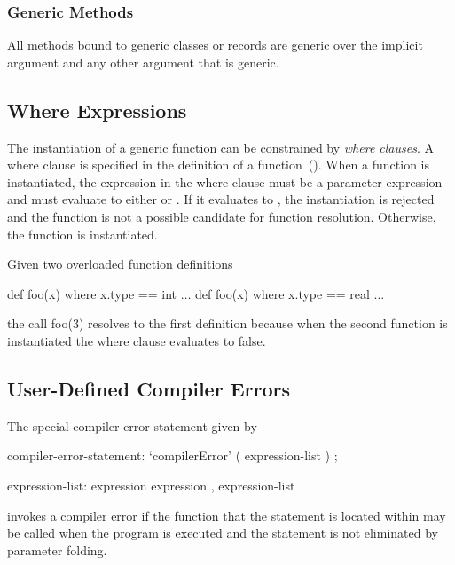 \subsubsection{Generic Methods}
\label{Generic_Methods}

All methods bound to generic classes or records are generic over the
implicit  argument and any other argument that is generic.

\subsection{Where Expressions}
\label{Where_Expressions}

The instantiation of a generic function can be constrained by {\em
where clauses}.  A where clause is specified in the definition of a
function~().  When a function is
instantiated, the expression in the where clause must be a parameter
expression and must evaluate to either  or .
If it evaluates to , the instantiation is rejected and the
function is not a possible candidate for function resolution.
Otherwise, the function is instantiated.
\begin{example}
Given two overloaded function definitions
\begin{chapel}
def foo(x) where x.type == int { $\ldots$ }
def foo(x) where x.type == real { $\ldots$ }
\end{chapel}
the call foo(3) resolves to the first definition because when the
second function is instantiated the where clause evaluates to false.
\end{example}

\subsection{User-Defined Compiler Errors}
\label{User_Defined_Compiler_Errors}

The special compiler error statement given by
\begin{syntax}
compiler-error-statement:
  `compilerError' ( expression-list ) ;

expression-list:
  expression
  expression , expression-list
\end{syntax}
invokes a compiler error if the function that the statement is located
within may be called when the program is executed and the statement is
not eliminated by parameter folding.

